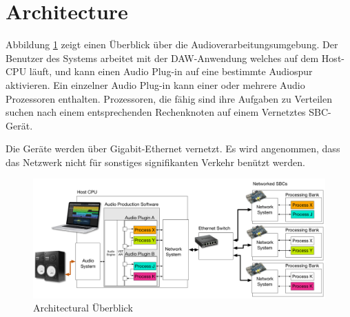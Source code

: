 \section{Architecture}

Abbildung \ref{fig:arch_01} zeigt einen Überblick über die Audioverarbeitungsumgebung. Der Benutzer des Systems arbeitet mit der DAW-Anwendung welches auf dem Host-CPU läuft, und kann einen Audio Plug-in auf eine bestimmte Audiospur aktivieren. Ein einzelner Audio Plug-in kann einer oder mehrere Audio Prozessoren enthalten. Prozessoren, die fähig sind ihre Aufgaben zu Verteilen suchen nach einem entsprechenden Rechenknoten auf einem Vernetztes SBC-Gerät.

Die Geräte werden über Gigabit-Ethernet vernetzt. Es wird angenommen, dass das Netzwerk nicht für sonstiges signifikanten Verkehr benützt werden.

\begin{figure}[H]
    \centering
    \includegraphics[width=\textwidth]{assets/architecture_01.pdf}
    \caption{Architectural Überblick}
    \label{fig:arch_01}
\end{figure}

